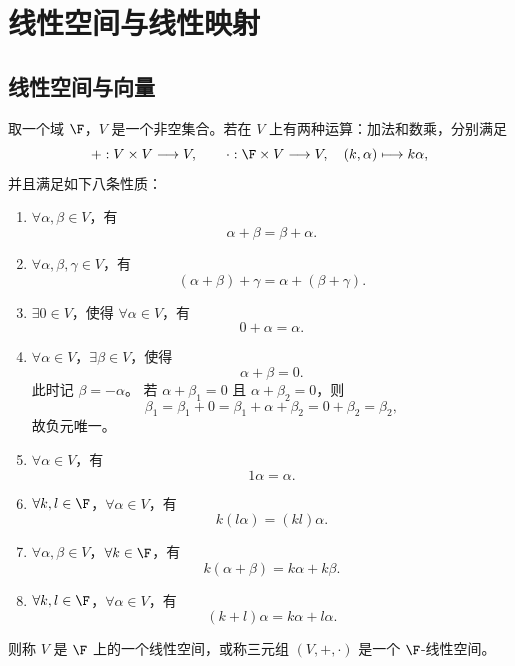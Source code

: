 \setchapterintro{}
\chapter{线性空间与线性映射}
\section{线性空间与向量}

\begin{definition}[线性空间]\label{p1:concept:c4-l7}
	取一个域 $\F$，$V$ 是一个非空集合。若在 $V$ 上有两种运算：加法和数乘，分别满足
	\[
	+ : V\times V\longrightarrow V,
	\qquad
	\cdot : \F\times V\longrightarrow V,
	\quad (k,\alpha)\longmapsto k\alpha,
	\]
	并且满足如下八条性质：
	\begin{enumerate}
		\item $\forall \alpha,\beta\in V$，有
		\[
		\alpha+\beta=\beta+\alpha .
		\]
		\item $\forall \alpha,\beta,\gamma\in V$，有
		\[
		(\alpha+\beta)+\gamma=\alpha+(\beta+\gamma) .
		\]
		\item $\exists 0\in V$，使得 $\forall \alpha\in V$，有
		\[
		0+\alpha=\alpha .
		\]
		\item $\forall \alpha\in V$，$\exists \beta\in V$，使得
		\[
		\alpha+\beta=0 .
		\]
		此时记 $\beta=-\alpha$。
		若 $\alpha+\beta_1=0$ 且 $\alpha+\beta_2=0$，则
		\[
		\beta_1=\beta_1+0
		=\beta_1+\alpha+\beta_2
		=0+\beta_2=\beta_2,
		\]
		故负元唯一。
		\item $\forall \alpha\in V$，有
		\[
		1\alpha=\alpha .
		\]
		\item $\forall k,l\in\F$，$\forall \alpha\in V$，有
		\[
		k(l\alpha)=(kl)\alpha .
		\]
		\item $\forall \alpha,\beta\in V$，$\forall k\in\F$，有
		\[
		k(\alpha+\beta)=k\alpha+k\beta .
		\]
		\item $\forall k,l\in\F$，$\forall \alpha\in V$，有
		\[
		(k+l)\alpha=k\alpha+l\alpha .
		\]
	\end{enumerate}
	则称 $V$ 是 $\F$ 上的一个线性空间，或称三元组 $(V,+,\cdot)$ 是一个 $\F$-线性空间。
\end{definition}

